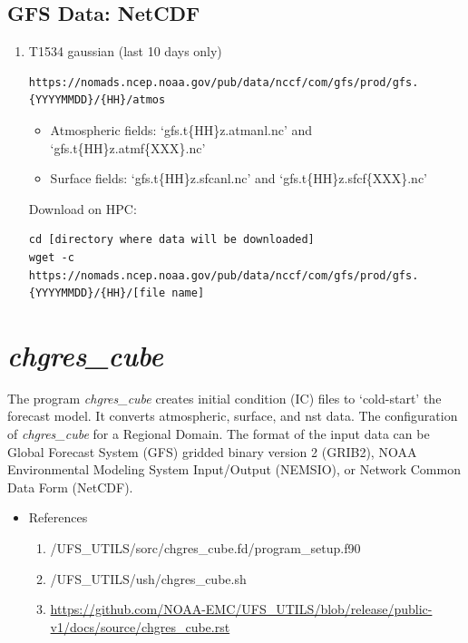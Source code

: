 \documentclass[11pt,fleqn]{report}              %
\begin{document}
\subsection{GFS Data: NetCDF}
\label{subsec:sar_data_netcdf}

\begin{enumerate}
\item T1534 gaussian (last 10 days only)
\lstset{language=bash}   
\begin{lstlisting}[frame=trBL]
https://nomads.ncep.noaa.gov/pub/data/nccf/com/gfs/prod/gfs.{YYYYMMDD}/{HH}/atmos
\end{lstlisting}

\begin{itemize}
\item Atmospheric fields: `gfs.t\{HH\}z.atmanl.nc' and `gfs.t\{HH\}z.atmf\{XXX\}.nc'
\item Surface fields: `gfs.t\{HH\}z.sfcanl.nc' and `gfs.t\{HH\}z.sfcf\{XXX\}.nc'
\end{itemize}

Download on HPC:
\lstset{language=bash}   
\begin{lstlisting}[frame=trBL]
cd [directory where data will be downloaded]
wget -c https://nomads.ncep.noaa.gov/pub/data/nccf/com/gfs/prod/gfs.{YYYYMMDD}/{HH}/[file name]
\end{lstlisting}

\end{enumerate}



\section{{\it chgres\_cube}}
\label{sec:glb2reg_chgrescube}

The program {\it chgres\_cube} creates initial condition (IC) files to `cold-start' the forecast model. It converts atmospheric, surface, and nst data. The configuration of {\it chgres\_cube} for a Regional Domain. The format of the input data can be Global Forecast System (GFS) gridded binary version 2 (GRIB2), NOAA Environmental Modeling System Input/Output (NEMSIO), or Network Common Data Form (NetCDF). 
\begin{itemize}
\item References
\begin{enumerate}
\item /UFS\_UTILS/sorc/chgres\_cube.fd/program\_setup.f90
\item /UFS\_UTILS/ush/chgres\_cube.sh
\item \url{https://github.com/NOAA-EMC/UFS_UTILS/blob/release/public-v1/docs/source/chgres_cube.rst}
\end{enumerate}
\end{itemize}
\end{document}

